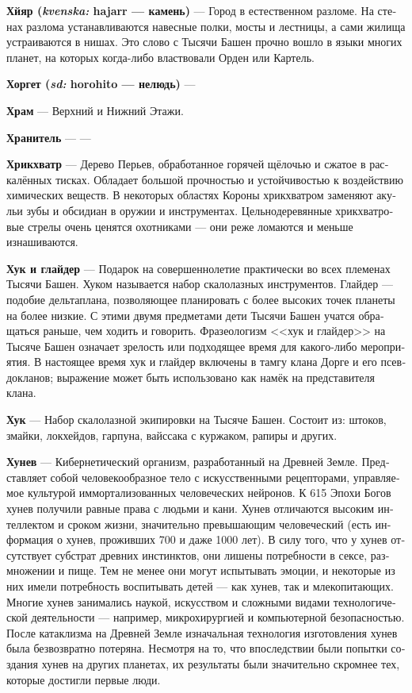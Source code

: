 \documentclass[a4paper,12pt,fleqn]{book}\usepackage{cooltooltips}\usepackage{polyglossia}\setdefaultlanguage[babelshorthands=true]{russian}\setotherlanguage{english}\defaultfontfeatures{Ligatures=TeX,Mapping=tex-text} \usepackage{xcolor}\definecolor{lightgray}{HTML}{bbbbbb}\color{lightgray}\newcommand{\ml}[3]{\textenglish{\textcolor{black}{#3}}}
\newcommand{\theterm}[3]{\textbf{\hypertarget{#1}{#2}} --- #3}
\newcommand{\theorigin}[3]{\textit{#1:} #2 --- #3}
\begin{document}
{\theterm{hjar}
{Хйяр (\theorigin{kvenska}{hajarr}{камень})}
{Город в естественном разломе.
На стенах разлома устанавливаются навесные полки, мосты и лестницы, а сами жилища устраиваются в нишах.
Это слово с Тысячи Башен прочно вошло в языки многих планет, на которых когда-либо властвовали Орден или Картель.}

\theterm{jorget}
{Хоргет (\theorigin{sd}{horohito}{нелюдь})}
{}

\theterm{temple}
{Храм}
{Верхний и Нижний Этажи.}

\theterm{keeper}
{Хранитель}
{---}

\theterm{chrikchuatr}
{Хрикхватр}
{Дерево Перьев, обработанное горячей щёлочью и сжатое в раскалённых тисках.
Обладает большой прочностью и устойчивостью к воздействию химических веществ.
В некоторых областях Короны хрикхватром заменяют акульи зубы и обсидиан в оружии и инструментах.
Цельнодеревянные хрикхватровые стрелы очень ценятся охотниками --- они реже ломаются и меньше изнашиваются.}

\theterm{hook-n-glider}
{Хук и глайдер}
{Подарок на совершеннолетие практически во всех племенах Тысячи Башен.
Хуком называется набор скалолазных инструментов.
Глайдер --- подобие дельтаплана, позволяющее планировать с более высоких точек планеты на более низкие.
С этими двумя предметами дети Тысячи Башен учатся обращаться раньше, чем ходить и говорить.
Фразеологизм <<хук и глайдер>> на Тысяче Башен означает зрелость или подходящее время для какого-либо мероприятия.
В настоящее время хук и глайдер включены в тамгу клана Дорге и его псевдокланов;
выражение может быть использовано как намёк на представителя клана.}

\theterm{hook}
{Хук}
{Набор скалолазной экипировки на Тысяче Башен.
Состоит из: штоков, змайки, локхейдов, гарпуна, вайссака с куржаком, рапиры и других.}

\theterm{huneu} %
{Хунев}
{Кибернетический организм, разработанный на Древней Земле.
Представляет собой человекообразное тело с искусственными рецепторами, управляемое культурой иммортализованных человеческих нейронов.
К 615 Эпохи Богов хунев получили равные права с людьми и кани.
Хунев отличаются высоким интеллектом и сроком жизни, значительно превышающим человеческий (есть информация о хунев, проживших 700 и даже 1000 лет).
В силу того, что у хунев отсутствует субстрат древних инстинктов, они лишены потребности в сексе, размножении и пище.
Тем не менее они могут испытывать эмоции, и некоторые из них имели потребность воспитывать детей --- как хунев, так и млекопитающих.
Многие хунев занимались наукой, искусством и сложными видами технологической деятельности --- например, микрохирургией и компьютерной безопасностью.
После катаклизма на Древней Земле изначальная технология изготовления хунев была безвозвратно потеряна.
Несмотря на то, что впоследствии были попытки создания хунев на других планетах, их результаты были значительно скромнее тех, которые достигли первые люди.}

}
\end{document}
